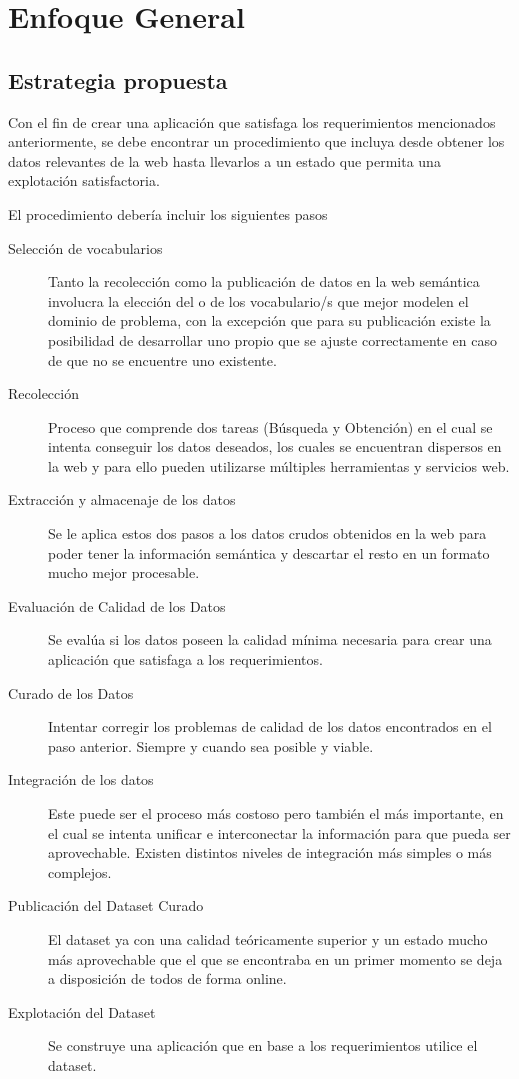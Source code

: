 \chapter{Enfoque General}
\label{chapter:estrategia}

\section{Estrategia propuesta}
Con el fin de crear una aplicación que satisfaga los requerimientos mencionados anteriormente, se debe encontrar
un procedimiento que incluya desde obtener los datos relevantes de la web hasta llevarlos a un estado que permita una 
explotación satisfactoria. 

El procedimiento debería incluir los siguientes pasos  

\begin{description}
\item[Selección de vocabularios ] Tanto la recolección como la publicación de datos en la web semántica involucra la elección del o de los vocabulario/s que mejor modelen el dominio de problema, con la excepción que para su publicación existe la posibilidad de desarrollar uno propio que se ajuste correctamente en caso de que no se encuentre uno existente. 
\item[Recolección  ] Proceso que comprende dos tareas (Búsqueda y Obtención) en el cual se intenta conseguir los datos deseados, los cuales se encuentran dispersos en la web y para ello pueden utilizarse múltiples herramientas y servicios web.
\item[Extracción y almacenaje de los datos] Se le aplica estos dos pasos a los datos crudos obtenidos en la web para poder tener la información semántica y descartar el resto en un formato mucho mejor procesable.
\item[Evaluación de Calidad de los Datos] Se evalúa si los datos poseen la calidad mínima necesaria para crear una aplicación que satisfaga a los requerimientos.
\item[Curado de los Datos] Intentar corregir los problemas de calidad de los datos encontrados en el paso anterior. Siempre y cuando sea posible y viable.
\item[Integración de los datos] Este puede ser el proceso más costoso pero también el más importante, en el cual se intenta unificar e interconectar la información para que pueda ser aprovechable. Existen distintos niveles de integración más simples o más complejos.
\item[Publicación del Dataset Curado] El dataset ya con una calidad teóricamente superior y un estado mucho más aprovechable que el que se encontraba en un primer momento se deja a disposición de todos de forma online.  
\item[Explotación del Dataset] Se construye una aplicación que en base a los requerimientos utilice el dataset. 
\end{description}

